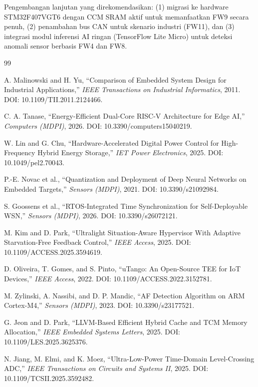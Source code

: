 \documentclass[12pt,a4paper]{article}
\begin{document}
Pengembangan lanjutan yang direkomendasikan: (1) migrasi ke hardware STM32F407VGT6 dengan CCM SRAM aktif untuk memanfaatkan FW9 secara penuh, (2) penambahan bus CAN untuk skenario industri (FW11), dan (3) integrasi modul inferensi AI ringan (TensorFlow Lite Micro) untuk deteksi anomali sensor berbasis FW4 dan FW8.

\newpage
\begin{thebibliography}{99}

 A. Malinowski and H. Yu, ``Comparison of Embedded System Design for Industrial Applications,'' \textit{IEEE Transactions on Industrial Informatics}, 2011. DOI: 10.1109/TII.2011.2124466.

 C. A. Tanase, ``Energy-Efficient Dual-Core RISC-V Architecture for Edge AI,'' \textit{Computers (MDPI)}, 2026. DOI: 10.3390/computers15040219.

 W. Lin and G. Chu, ``Hardware-Accelerated Digital Power Control for High-Frequency Hybrid Energy Storage,'' \textit{IET Power Electronics}, 2025. DOI: 10.1049/pel2.70043.

 P.-E. Novac et al., ``Quantization and Deployment of Deep Neural Networks on Embedded Targets,'' \textit{Sensors (MDPI)}, 2021. DOI: 10.3390/s21092984.

 S. Goossens et al., ``RTOS-Integrated Time Synchronization for Self-Deployable WSN,'' \textit{Sensors (MDPI)}, 2026. DOI: 10.3390/s26072121.

 M. Kim and D. Park, ``Ultralight Situation-Aware Hypervisor With Adaptive Starvation-Free Feedback Control,'' \textit{IEEE Access}, 2025. DOI: 10.1109/ACCESS.2025.3594619.

 D. Oliveira, T. Gomes, and S. Pinto, ``uTango: An Open-Source TEE for IoT Devices,'' \textit{IEEE Access}, 2022. DOI: 10.1109/ACCESS.2022.3152781.

 M. Zylinski, A. Nassibi, and D. P. Mandic, ``AF Detection Algorithm on ARM Cortex-M4,'' \textit{Sensors (MDPI)}, 2023. DOI: 10.3390/s23177521.

 G. Jeon and D. Park, ``LLVM-Based Efficient Hybrid Cache and TCM Memory Allocation,'' \textit{IEEE Embedded Systems Letters}, 2025. DOI: 10.1109/LES.2025.3625376.

 N. Jiang, M. Elmi, and K. Moez, ``Ultra-Low-Power Time-Domain Level-Crossing ADC,'' \textit{IEEE Transactions on Circuits and Systems II}, 2025. DOI: 10.1109/TCSII.2025.3592482.


\end{thebibliography}
\end{document}
